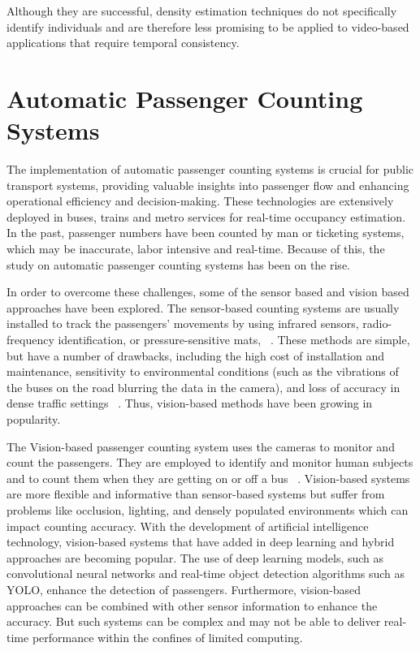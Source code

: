 Although they are successful, density estimation techniques do not specifically identify individuals and are therefore less promising to be applied to video-based applications that require temporal consistency.

\section{Automatic Passenger Counting Systems}

The implementation of automatic passenger counting systems is crucial for public transport systems, providing valuable insights into passenger flow and enhancing operational efficiency and decision-making. These technologies are extensively deployed in buses, trains and metro services for real-time occupancy estimation. In the past, passenger numbers have been counted by man or ticketing systems, which may be inaccurate, labor intensive and real-time. Because of this, the study on automatic passenger counting systems has been on the rise.

In order to overcome these challenges, some of the sensor based and vision based approaches have been explored. The sensor-based counting systems are usually installed to track the passengers' movements by using infrared sensors, radio-frequency identification, or pressure-sensitive mats, ~\cite{Aleksander2024}. These methods are simple, but have a number of drawbacks, including the high cost of installation and maintenance, sensitivity to environmental conditions (such as the vibrations of the buses on the road blurring the data in the camera), and loss of accuracy in dense traffic settings ~\cite{Irene2019}. Thus, vision-based methods have been growing in popularity.

The Vision-based passenger counting system uses the cameras to monitor and count the passengers. They are employed to identify and monitor human subjects and to count them when they are getting on or off a bus ~\cite{Saddam2020}. Vision-based systems are more flexible and informative than sensor-based systems but suffer from problems like occlusion, lighting, and densely populated environments which can impact counting accuracy. With the development of artificial intelligence technology, vision-based systems that have added in deep learning and hybrid approaches are becoming popular. The use of deep learning models, such as convolutional neural networks and real-time object detection algorithms such as YOLO, enhance the detection of passengers. Furthermore, vision-based approaches can be combined with other sensor information to enhance the accuracy. But such systems can be complex and may not be able to deliver real-time performance within the confines of limited computing. 

